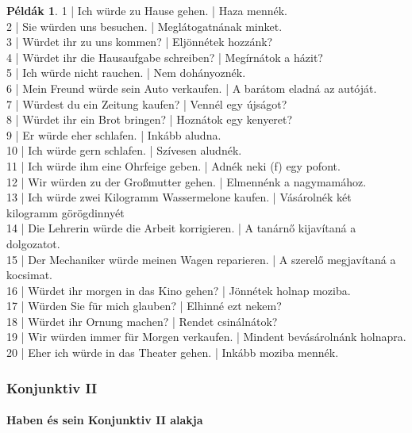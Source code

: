 \documentclass{article}
\theoremstyle{definition}
\newtheorem*{exmp}{Példák}
\begin{document}
\begin{exmp}
1 | Ich würde zu Hause gehen. | Haza mennék.\\
2 | Sie würden uns besuchen. | Meglátogatnának minket.\\
3 | Würdet ihr zu uns kommen? | Eljönnétek hozzánk?\\
4 | Würdet ihr die Hausaufgabe schreiben? | Megírnátok a házit?\\
5 | Ich würde nicht rauchen. | Nem dohányoznék.\\
6 | Mein Freund würde sein Auto verkaufen. | A barátom eladná az autóját.\\
7 | Würdest du ein Zeitung kaufen? | Vennél egy újságot?\\
8 | Würdet ihr ein Brot bringen? | Hoznátok egy kenyeret?\\
9 | Er würde eher schlafen. | Inkább aludna.\\
10 | Ich würde gern schlafen. | Szívesen aludnék.\\
11 | Ich würde ihm eine Ohrfeige geben. | Adnék neki (f) egy pofont.\\
12 | Wir würden zu der Großmutter gehen. | Elmennénk a nagymamához.\\
13 | Ich würde zwei Kilogramm Wassermelone kaufen. | Vásárolnék két kilogramm görögdinnyét\\
14 | Die Lehrerin würde die Arbeit korrigieren. | A tanárnő kijavítaná a dolgozatot.\\
15 | Der Mechaniker würde meinen Wagen reparieren. | A szerelő megjavítaná a kocsimat.\\
16 | Würdet ihr morgen in das Kino gehen? | Jönnétek holnap moziba.\\
17 | Würden Sie für mich glauben? | Elhinné ezt nekem?\\
18 | Würdet ihr Ornung machen? | Rendet csinálnátok?\\
19 | Wir würden immer für Morgen verkaufen. | Mindent bevásárolnánk holnapra.\\
20 | Eher ich würde in das Theater gehen. | Inkább moziba mennék.\\
\end{exmp}

\subsubsection{Konjunktiv II}

\paragraph{Haben és sein Konjunktiv II alakja}
\end{document}
